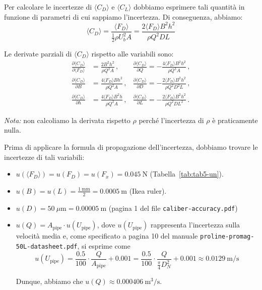 \NotionDivider

Per calcolare le incertezze di $\langle C_D\rangle$ e $\langle C_L\rangle$ dobbiamo esprimere tali quantità in funzione di parametri di cui sappiamo l'incertezza. Di conseguenza, abbiamo:
\begin{equation*}
\langle C_D \rangle = \frac{\langle F_D \rangle}{\frac{1}{2} \rho U_b^2 A} = \frac{2 \langle F_D \rangle B^2 h^2}{ \rho Q^2 DL}
\end{equation*}

Le derivate parziali di $\langle C_D \rangle$ rispetto alle variabili sono:
\begin{align*}
\frac{\partial \langle C_D \rangle}{\partial \langle F_D \rangle} &= \frac{2 B^2h^2}{\rho Q^2 A}\,, &\frac{\partial \langle C_D \rangle}{\partial Q} = -\frac{4 \langle F_D \rangle B^2h^2}{\rho Q^3 A}\,, \\
\frac{\partial \langle C_D \rangle}{\partial B} &= \frac{4 \langle F_D \rangle B h^2}{\rho Q^2 A}\,, &\frac{\partial \langle C_D \rangle}{\partial D} = -\frac{2 \langle F_D \rangle B^2h^2}{\rho Q^2 D^2 L}\,, \\
\frac{\partial \langle C_D \rangle}{\partial h} &= \frac{4 \langle F_D \rangle B^2 h}{\rho Q^2 A}\,, &\frac{\partial \langle C_D \rangle}{\partial L} = -\frac{2 \langle F_D \rangle B^2h^2}{\rho Q^2 D L^2}\,.
\end{align*}

\emph{Nota:} non calcoliamo la derivata rispetto $\rho$ perché l'incertezza di $\rho$ è praticamente nulla.

Prima di applicare la formula di propagazione dell'incertezza, dobbiamo trovare le incertezze di tali variabili:
\begin{itemize}
\item $u(\langle F_D \rangle)=u(F_D)=u(F_x)=0.045~$N (Tabella~\ref{tab:tab5-un}).
\item $u(B)=u(L)=\frac{1 ~ \text{mm}}{2} = 0.0005 ~ \text{m}$ (Ikea ruler).
\item $u(D) = 50~\mu\text{m} = 0.00005 ~ \text{m}$ (pagina 1 del file \texttt{caliber-accuracy.pdf})
\item $u(Q)=A_\text{pipe}\cdot u(U_\text{pipe})$, dove $u(U_\text{pipe})$ rappresenta l'incertezza sulla velocità media e, come specificato a pagina 10 del manuale \texttt{proline-promag-50L-datasheet.pdf}, si esprime come
\begin{equation*}
u(U_\text{pipe})= \frac{0.5}{100} \cdot \frac{Q}{A_\text{pipe}} + 0.001 = \frac{0.5}{100} \cdot \frac{Q}{\frac{\pi}{4} D_N^2} + 0.001 \approx 0.0129  ~ \text{m/s}  
\end{equation*}

Dunque, abbiamo che $u(Q)\approx 0.000406~\text{m}^3/\text{s}$.
\end{itemize}

